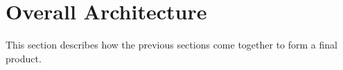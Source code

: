 \chapter{Overall Architecture}
This section describes how the previous sections come together to form a final product. 

